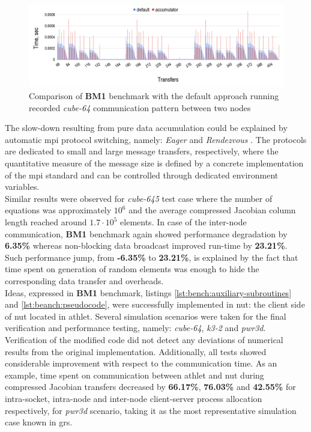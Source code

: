 \begin{figure}[htpb]
  \centering
  \includegraphics[width=1.0\textwidth]{figures/chapter-3/benchmark-result-non-blocking-inter-node-comm.png}
  \caption{Comparison of \textbf{BM1} benchmark with the default approach running recorded \textit{cube-64} communication pattern between two nodes}
\label{fig:benchmark:results-cube-64-inter-node-comm}
\end{figure}


The slow-down resulting from pure data accumulation could be explained by automatic \gls{mpi} protocol switching, namely: \textit{Eager} and \textit{Rendezvous} \cite{mpi:protocols-explanation}. The protocols are dedicated to small and large message transfers, respectively, where the quantitative measure of the message size is defined by a concrete implementation of the \gls{mpi} standard and can be controlled through dedicated environment variables.\\



Similar results were observed for \textit{cube-645} test case where the number of equations was approximately $10^6$ and the average compressed Jacobian column length reached around $1.7 \cdot 10^5$ elements. In case of the inter-node communication, \textbf{BM1} benchmark again showed performance degradation by \textbf{6.35\%} whereas non-blocking data broadcast improved run-time by \textbf{23.21\%}. Such performance jump, from \textbf{-6.35\%} to \textbf{23.21\%}, is explained by the fact that time spent on generation of random elements was enough to hide the corresponding data transfer and overheads.\\



Ideas, expressed in \textbf{BM1} benchmark, listings \ref{lst:bench:auxiliary-subroutines} and \ref{lst:beanch:pseudocode}, were successfully implemented in \gls{nut}: the client side of \gls{nut} located in \gls{athlet}. Several simulation scenarios were taken for the final verification and performance testing, namely: \textit{cube-64}, \textit{k3-2} and \textit{pwr3d}. Verification of the modified code did not detect any deviations of numerical results from the original implementation. Additionally, all tests showed considerable improvement with respect to the communication time. As an example, time spent on communication between \gls{athlet} and \gls{nut} during compressed Jacobian transfers decreased by \textbf{66.17\%}, \textbf{76.03\%} and \textbf{42.55\%} for intra-socket, intra-node and inter-node client-server process allocation respectively, for \textit{pwr3d} scenario, taking it as the most representative simulation case known in \gls{grs}.\\


